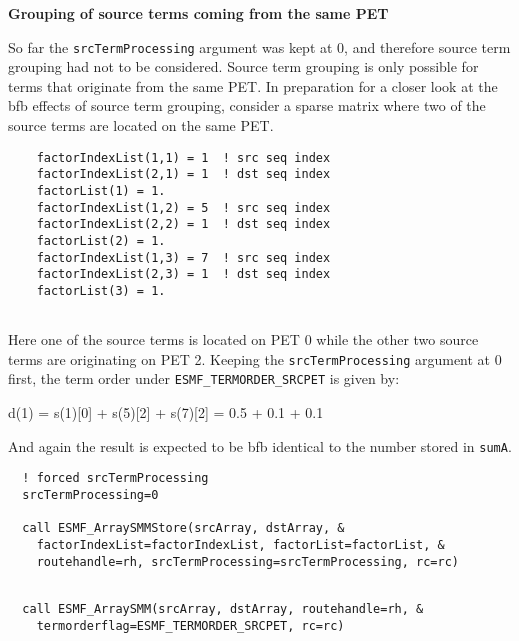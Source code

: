 
   {\bf Grouping of source terms coming from the same PET}
  
   So far the {\tt srcTermProcessing} argument was kept at 0, and therefore
   source term grouping had not to be considered. Source term grouping is only
   possible for terms that originate from the same PET. In preparation
   for a closer look at the bfb effects of source term grouping, consider a 
   sparse matrix where two of the source terms are located on the same PET. 

 \begin{verbatim}
    factorIndexList(1,1) = 1  ! src seq index
    factorIndexList(2,1) = 1  ! dst seq index
    factorList(1) = 1.
    factorIndexList(1,2) = 5  ! src seq index
    factorIndexList(2,2) = 1  ! dst seq index
    factorList(2) = 1.
    factorIndexList(1,3) = 7  ! src seq index
    factorIndexList(2,3) = 1  ! dst seq index
    factorList(3) = 1.
 
\end{verbatim}
 

   Here one of the source terms is located on PET 0 while the other two
   source terms are originating on PET 2. Keeping the {\tt srcTermProcessing}
   argument at 0 first, the term order under {\tt ESMF\_TERMORDER\_SRCPET} is 
   given by:
  
       d(1) = s(1)[0] + s(5)[2] + s(7)[2] = 0.5 + 0.1 + 0.1
  
   And again the result is expected to be bfb identical to the number stored 
   in {\tt sumA}. 

 \begin{verbatim}
  ! forced srcTermProcessing
  srcTermProcessing=0
  
  call ESMF_ArraySMMStore(srcArray, dstArray, &
    factorIndexList=factorIndexList, factorList=factorList, &
    routehandle=rh, srcTermProcessing=srcTermProcessing, rc=rc)
 
\end{verbatim}
 

 \begin{verbatim}
  call ESMF_ArraySMM(srcArray, dstArray, routehandle=rh, &
    termorderflag=ESMF_TERMORDER_SRCPET, rc=rc)
 
\end{verbatim}
 
